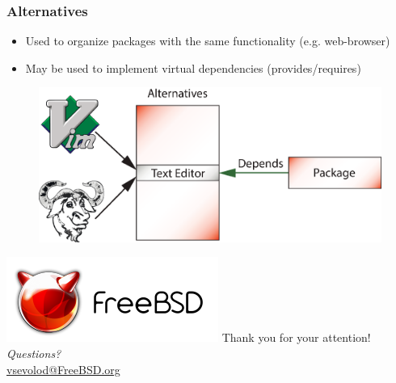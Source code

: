 \documentclass{beamer}
\begin{document}
\begin{frame}
\frametitle{Alternatives}
\begin{itemize}
  \item Used to organize packages with the same functionality (e.g.
  web-browser)
  \item May be used to implement virtual dependencies (provides/requires)
\end{itemize}
\begin{figure}[h!]
  \centering
  \includegraphics[height=0.4\textheight]{q7.eps}
\end{figure}
\end{frame}

\begin{frame}
\begin{center}
\includegraphics{logo.pdf}
{\Large Thank you for your attention!} \\
\emph{Questions?} \\[4pt]
\url{vsevolod@FreeBSD.org}
\end{center}
\end{frame}
\end{document}

